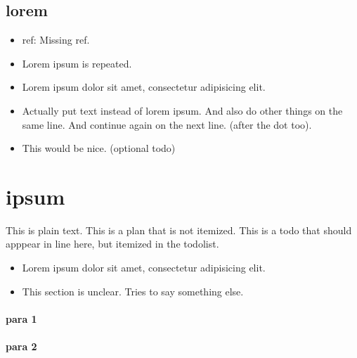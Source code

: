 \subsection{lorem}
\label{autosec:3}
    \begin{itemize}[noitemsep]
        \item {\color{Periwinkle}ref: Missing ref.}
        \item {\color{DarkOrchid}Lorem ipsum is repeated.}
        \item Lorem ipsum dolor sit amet, consectetur adipisicing elit.
        \item {\color{red}Actually put text instead of lorem ipsum. And also do other things on the same line.}
{\color{red}And continue again on the next line. (after the dot too).}
        \item {\color{Orange}This would be nice. (optional todo)}
    \end{itemize}
\section{ipsum}
\label{autosec:4}
This is plain text.
{\color{blue}This is a plan that is not itemized.}
{\color{red}This is a todo that should apppear in line here, but itemized in the todolist.}
    \begin{itemize}[noitemsep]
        \item Lorem ipsum dolor sit amet, consectetur adipisicing elit.
        \item {\color{OliveGreen}This section is unclear.}
{\color{OliveGreen}Tries to say something else.}
    \end{itemize}
\paragraph{para 1}
\label{autosec:5}
\paragraph{para 2}
\label{autosec:5}

